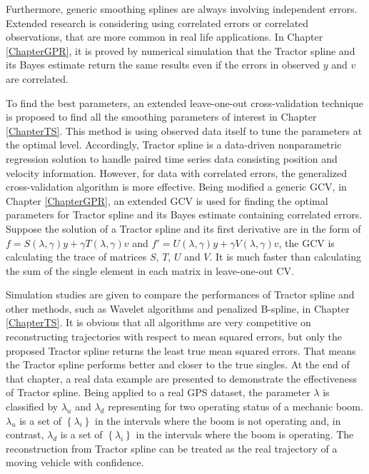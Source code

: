 Furthermore, generic smoothing splines are always involving independent errors. Extended research is considering using correlated errors or correlated observations, that are more common in real life applications. In Chapter \ref{ChapterGPR}, it is proved by numerical simulation that the Tractor spline and its Bayes estimate return the same results even if the errors in observed $y$ and $v$ are correlated.  

To find the best parameters, an extended leave-one-out cross-validation technique is proposed to find all the smoothing parameters of interest in Chapter \ref{ChapterTS}. This method is using observed data itself to tune the parameters at the optimal level. Accordingly, Tractor spline is a data-driven nonparametric regression solution to handle paired time series data consisting position and velocity information. However, for data with correlated errors, the generalized cross-validation algorithm is more effective. Being modified a generic GCV, in Chapter \ref{ChapterGPR}, an extended GCV is used for finding the optimal parameters for Tractor spline and its Bayes estimate containing correlated errors. Suppose the solution of a Tractor spline and its first derivative are in the form of $f=S(\lambda,\gamma)y+\gamma T(\lambda,\gamma)v$ and $f'=U(\lambda,\gamma)y+\gamma V(\lambda,\gamma)v$, the GCV is calculating the trace of matrices $S$, $T$, $U$ and $V$. It is much faster than calculating the sum of the single element in each matrix in leave-one-out CV. 

Simulation studies are given to compare the performances of Tractor spline and other methods, such as Wavelet algorithms and penalized B-spline, in Chapter \ref{ChapterTS}. It is obvious that all algorithms are very competitive on reconstructing trajectories with respect to mean squared errors, but only the proposed Tractor spline returns the least true mean squared errors. That means the Tractor spline performs better and closer to the true singles. At the end of that chapter, a real data example are presented to demonstrate the effectiveness of Tractor spline. Being applied to a real GPS dataset, the parameter $\lambda$ is classified by $\lambda_u$ and $\lambda_d$ representing for two operating status of a mechanic boom. $\lambda_u$ is a set of $\left\lbrace\lambda_i\right\rbrace$ in the intervals where the boom is not operating and, in contrast, $\lambda_d$ is a set of $\left\lbrace\lambda_i\right\rbrace$ in the intervals where the boom is operating. The reconstruction from Tractor spline can be treated as the real trajectory of a moving vehicle with confidence. 

